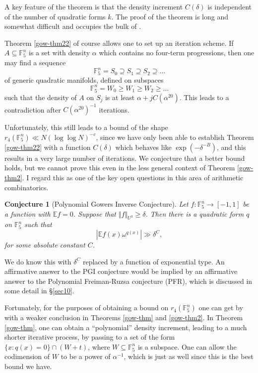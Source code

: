 \documentclass[12pt,a4paper,reqno]{amsart}
\numberwithin{equation}{section}
\theoremstyle{plain}
\newtheorem{conjecture}[subsection]{Conjecture}
\theoremstyle{definition}
\renewcommand{\geq}{\geqslant}
\begin{document}
\noindent A key feature of the theorem is that the density increment $C(\delta)$ is independent of the number of quadratic forms $k$. The proof of the theorem is long and somewhat difficult and occupies the bulk of \cite{green-tao-ap4s}.\vspace{11pt}

\noindent Theorem \ref{gow-thm22} of course allows one to set up an iteration scheme. If $A \subseteq \mathbb{F}_5^n$ is a set with density $\alpha$ which contains no four-term progressions, then one may find a sequence \[ \mathbb{F}_5^n = S_0 \supseteq S_1 \supseteq S_2 \supseteq \dots \] of generic quadratic manifolds, defined on subspaces \[ \mathbb{F}_5^n = W_0 \geq W_1 \geq W_2 \geq \dots \] such that the density of $A$ on $S_j$ is at least $\alpha + jC(\alpha^{20})$. This leads to a contradiction after $C(\alpha^{20})^{-1}$ iterations.\vspace{11pt}

\noindent Unfortunately, this still leads to a bound of the shape $r_4(\mathbb{F}_5^n) \ll N(\log \log N)^{-c}$, since we have only been able to establish Theorem \ref{gow-thm22} with a function $C(\delta)$ which behaves like $\exp(-\delta^{-B})$, and this results in a very large number of iterations. We conjecture that a better bound holds, but we cannot prove this even in the less general context of Theorem \ref{gow-thm2}. I regard this as one of the key open questions in this area of arithmetic combinatorics.

\begin{conjecture}[Polynomial Gowers Inverse Conjecture]\label{quad-inverse}
Let $f : \mathbb{F}_5^n \rightarrow [-1,1]$ be a function with $\mathbb{E}f = 0$. Suppose that $\Vert f \Vert_{U^3} \geq \delta$. Then there is a quadratic form $q$ on $\mathbb{F}_5^n$ such that
\[ |\mathbb{E} f(x) \omega^{q(x)}| \gg \delta^{C},\] for some absolute constant $C$.
\end{conjecture}

\noindent We do know this with $\delta^{C}$ replaced by a function of exponential type. An affirmative answer to the PGI conjecture would be implied by an affirmative answer to the Polynomial Freiman-Ruzsa conjecture (PFR), which is discussed in some detail in \S \ref{sec10}.\vspace{11pt}

\noindent Fortunately, for the purposes of obtaining a bound on $r_4(\mathbb{F}_5^n)$ one can get by with a weaker conclusion in Theorems \ref{gow-thm} and \ref{gow-thm2}. In Theorem \ref{gow-thm}, one can obtain a ``polynomial'' density increment, leading to a much shorter iterative process, by passing to a set of the form $\{x : q(x) = 0\} \cap (W + t)$, where $W \subseteq \mathbb{F}_5^n$ is a subspace. One can allow the codimension of $W$ to be a power of $\alpha^{-1}$, which is just as well since this is the best bound we have.
\end{document}
